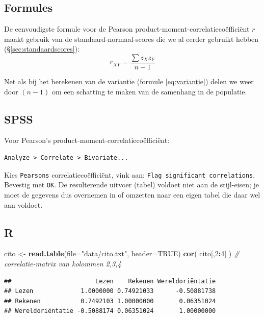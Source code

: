 \documentclass[
]{book}
\newenvironment{Shaded}{\begin{snugshade}}{\end{snugshade}}
\newcommand{\CommentTok}[1]{\textcolor[rgb]{0.56,0.35,0.01}{\textit{#1}}}
\newcommand{\DataTypeTok}[1]{\textcolor[rgb]{0.13,0.29,0.53}{#1}}
\newcommand{\DecValTok}[1]{\textcolor[rgb]{0.00,0.00,0.81}{#1}}
\newcommand{\KeywordTok}[1]{\textcolor[rgb]{0.13,0.29,0.53}{\textbf{#1}}}
\newcommand{\NormalTok}[1]{#1}
\newcommand{\OperatorTok}[1]{\textcolor[rgb]{0.81,0.36,0.00}{\textbf{#1}}}
\newcommand{\OtherTok}[1]{\textcolor[rgb]{0.56,0.35,0.01}{#1}}
\newcommand{\StringTok}[1]{\textcolor[rgb]{0.31,0.60,0.02}{#1}}
\begin{document}
\hypertarget{formules-3}{%
\subsection{Formules}\label{formules-3}}

De eenvoudigste formule voor de Pearson
product-moment-correlatiecoëfficiënt \(r\) maakt gebruik van de
standaard-normaal-scores die we al eerder gebruikt hebben
(§\ref{sec:standaardscores}):
\begin{equation}
    r_{XY} = \frac{\sum z_X z_Y}{n-1}
  \label{eq:pearson}
\end{equation}

Net als bij het berekenen van de variantie
(formule \eqref{eq:variantie}) delen we weer door \((n-1)\) om een schatting
te maken van de samenhang in de populatie.

\hypertarget{spss-5}{%
\subsection{SPSS}\label{spss-5}}

Voor Pearson's product-moment-correlatiecoëfficiënt:

\begin{verbatim}
Analyze > Correlate > Bivariate...
\end{verbatim}

Kies \texttt{Pearsons} correlatiecoëfficiënt, vink aan:
\texttt{Flag\ significant\ correlations}. Bevestig met \texttt{OK}. De resulterende
uitvoer (tabel) voldoet niet aan de stijl-eisen; je moet de gegevens dus
overnemen in of omzetten naar een eigen tabel die daar wel aan voldoet.

\hypertarget{r-6}{%
\subsection{R}\label{r-6}}

\begin{Shaded}
\begin{Highlighting}[]
\NormalTok{cito \textless{}{-}}\StringTok{ }\KeywordTok{read.table}\NormalTok{(}\DataTypeTok{file=}\StringTok{"data/cito.txt"}\NormalTok{, }\DataTypeTok{header=}\OtherTok{TRUE}\NormalTok{)}
\KeywordTok{cor}\NormalTok{( cito[,}\DecValTok{2}\OperatorTok{:}\DecValTok{4}\NormalTok{] ) }\CommentTok{\# correlatie{-}matrix van kolommen 2,3,4}
\end{Highlighting}
\end{Shaded}

\begin{verbatim}
##                       Lezen    Rekenen Wereldoriëntatie
## Lezen             1.0000000 0.74921033      -0.50881738
## Rekenen           0.7492103 1.00000000       0.06351024
## Wereldoriëntatie -0.5088174 0.06351024       1.00000000
\end{verbatim}
\end{document}
